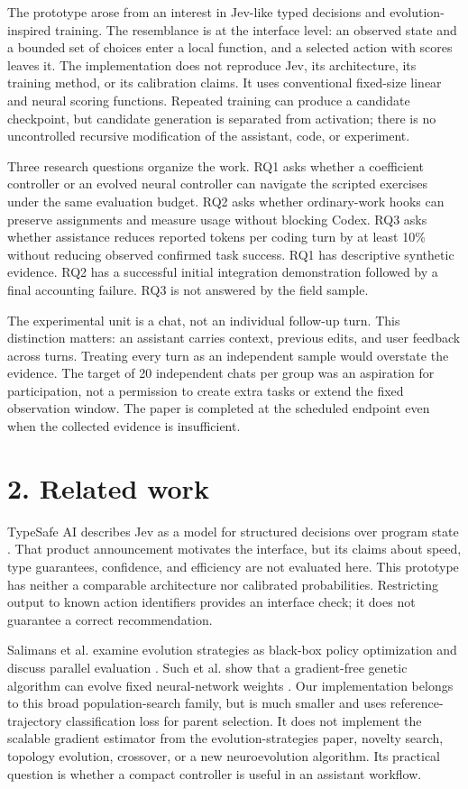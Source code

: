 \documentclass[11pt]{article}
\begin{document}
The prototype arose from an interest in Jev-like typed decisions and evolution-inspired training. The resemblance is at the interface level: an observed state and a bounded set of choices enter a local function, and a selected action with scores leaves it. The implementation does not reproduce Jev, its architecture, its training method, or its calibration claims. It uses conventional fixed-size linear and neural scoring functions. Repeated training can produce a candidate checkpoint, but candidate generation is separated from activation; there is no uncontrolled recursive modification of the assistant, code, or experiment.

Three research questions organize the work. RQ1 asks whether a coefficient controller or an evolved neural controller can navigate the scripted exercises under the same evaluation budget. RQ2 asks whether ordinary-work hooks can preserve assignments and measure usage without blocking Codex. RQ3 asks whether assistance reduces reported tokens per coding turn by at least 10\% without reducing observed confirmed task success. RQ1 has descriptive synthetic evidence. RQ2 has a successful initial integration demonstration followed by a final accounting failure. RQ3 is not answered by the field sample.

The experimental unit is a chat, not an individual follow-up turn. This distinction matters: an assistant carries context, previous edits, and user feedback across turns. Treating every turn as an independent sample would overstate the evidence. The target of 20 independent chats per group was an aspiration for participation, not a permission to create extra tasks or extend the fixed observation window. The paper is completed at the scheduled endpoint even when the collected evidence is insufficient.

\section*{2. Related work}
TypeSafe AI describes Jev as a model for structured decisions over program state \cite{r1}. That product announcement motivates the interface, but its claims about speed, type guarantees, confidence, and efficiency are not evaluated here. This prototype has neither a comparable architecture nor calibrated probabilities. Restricting output to known action identifiers provides an interface check; it does not guarantee a correct recommendation.

Salimans et al. examine evolution strategies as black-box policy optimization and discuss parallel evaluation \cite{r2}. Such et al. show that a gradient-free genetic algorithm can evolve fixed neural-network weights \cite{r3}. Our implementation belongs to this broad population-search family, but is much smaller and uses reference-trajectory classification loss for parent selection. It does not implement the scalable gradient estimator from the evolution-strategies paper, novelty search, topology evolution, crossover, or a new neuroevolution algorithm. Its practical question is whether a compact controller is useful in an assistant workflow.
\end{document}
